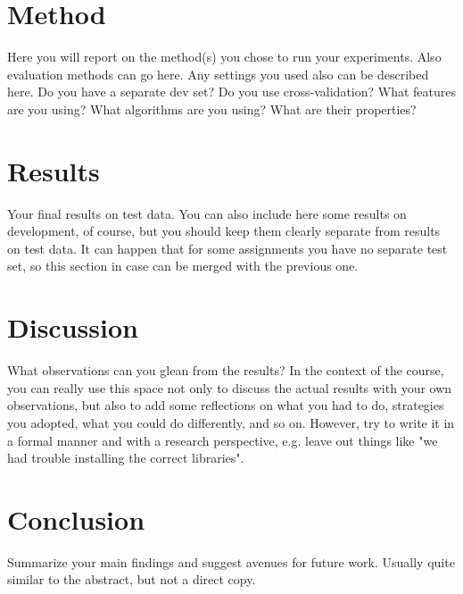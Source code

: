 \documentclass[11pt]{article}
\begin{document}
\section{Method}

Here you will report on the method(s) you chose to run your experiments. Also evaluation methods can go here. Any settings you used also can be described here. Do you have a separate dev set? Do you use cross-validation? What features are you using? What algorithms are you using? What are their properties?

\section{Results}

Your final results on test data. You can also include here some results on development, of course, but you should keep them clearly separate from results on test data. It can happen that for some assignments you have no separate test set, so this section in case can be merged with the previous one.

\section{Discussion}

What observations can you glean from the results? In the context of the course, you can really use this space not only to discuss the actual results with your own observations, but also to add some reflections on what you had to do, strategies you adopted, what you could do differently, and so on. However, try to write it in a formal manner and with a research perspective, e.g. leave out things like "we had trouble installing the correct libraries".

\section{Conclusion}

Summarize your main findings and suggest avenues for future work. Usually quite similar to the abstract, but not a direct copy.





\end{document}

